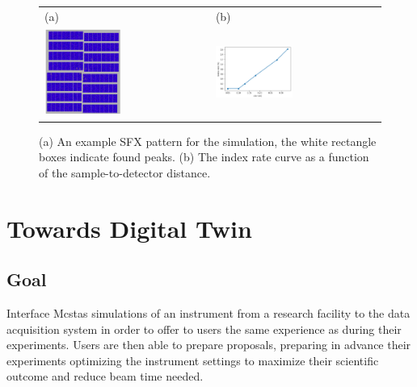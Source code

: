 \documentclass[11pt, a4paper]{article}
\begin{document}
\begin{figure}
\centering
\begin{tabular}{m{3.2in} m{3.2in}}
\LARGE{(a)}     &   \LARGE{(b)}\\
\includegraphics[width=0.48\textwidth]{figures/SFX_pattern.png} &
\includegraphics[width=0.48\textwidth]{figures/optimize_curve.png} 
\end{tabular}
\caption 
{\label{fig:optSim}
(a) An example SFX pattern for the simulation, the white rectangle boxes indicate found peaks. (b) The index rate curve as a function of the sample-to-detector distance.} 
\end{figure}

\clearpage
\section{Towards Digital Twin}
\subsection{Goal}
Interface Mcstas simulations of an instrument from a research facility to the data acquisition system in order to offer to users the same experience as during their experiments. Users are then able to prepare proposals, preparing in advance their experiments optimizing the instrument settings to maximize their scientific outcome and reduce beam time needed.
\end{document}
